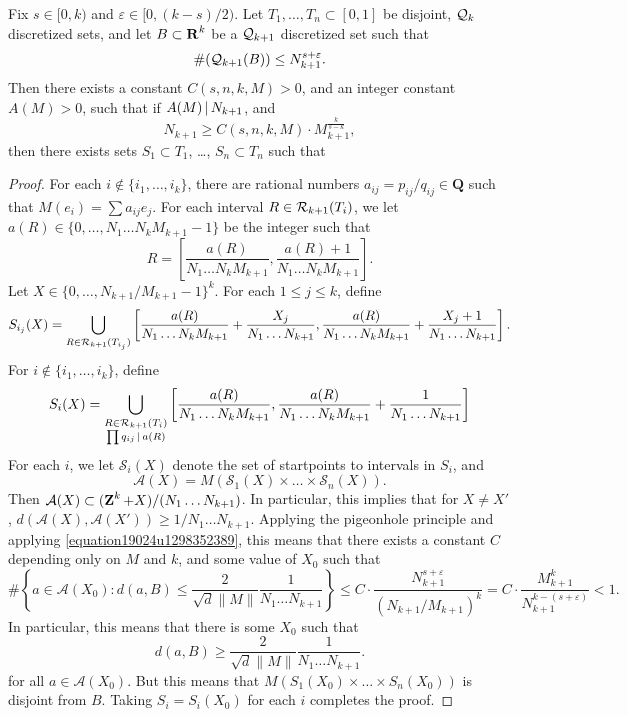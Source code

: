 \begin{theorem} \label{theorem059891891829}
    Fix $s \in [0,k)$ and $\varepsilon \in [0, (k-s)/2)$. Let $T_1, \dots, T_n \subset [0,1]$ be disjoint, $\operatorname{\mathcal{Q}}_k$ discretized sets, and let $B \subset \operatorname{\mathbf{R}}^k$ be a $\operatorname{\mathcal{Q}}_{k+1}$ discretized set such that
    \[ \#(\operatorname{\mathcal{Q}}_{k+1}(B)) \leq N_{k+1}^{s + \varepsilon}. \]
    Then there exists a constant $C(s,n,k,M) > 0$, and an integer constant $A(M) > 0$, such that if $A(M) \operatorname{\mid} N_{k+1}$, and 
    \begin{equation} \label{equation19024u1298352389}
        N_{k+1} \geq C(s,n,k,M) \cdot M_{k+1}^{\frac{k}{s - k}},
    \end{equation}
    then there exists sets $S_1 \subset T_1$, \dots, $S_n \subset T_n$ such that

\end{theorem}
\begin{proof}
    For each $i \not \in \{ i_1, \dots, i_k \}$, there are rational numbers $a_{ij} = p_{ij}/q_{ij} \in \mathbf{Q}$ such that $M(e_i) = \sum a_{ij} e_j$. For each interval $R \in \operatorname{\mathcal{R}}_{k+1}(T_i)$, we let $a(R) \in \{ 0, \dots, N_1 \dots N_k M_{k+1} - 1 \}$ be the integer such that
    \[ R = \left[ \frac{a(R)}{N_1 \dots N_k M_{k+1}}, \frac{a(R) + 1}{N_1 \dots N_k M_{k+1}} \right]. \]
    Let $X \in \{ 0, \dots, N_{k+1}/M_{k+1} - 1 \}^k$. For each $1 \leq j \leq k$, define
    \[ S_{i_j}(X) = \bigcup_{R \in \operatorname{\mathcal{R}}_{k+1}(T_{i_j})} \left[ \frac{a(R)}{N_1 \dots N_k M_{k+1}} + \frac{X_j}{N_1 \dots N_{k+1}}, \frac{a(R)}{N_1 \dots N_k M_{k+1}} + \frac{X_j + 1}{N_1 \dots N_{k+1}} \right]. \]
    For $i \not \in \{ i_1, \dots, i_k \}$, define
    \[ S_i(X) = \bigcup_{\substack{R \in \operatorname{\mathcal{R}}_{k+1}(T_i)\\ \prod q_{ij} \operatorname{\mid} a(R)}} \left[ \frac{a(R)}{N_1 \dots N_k M_{k+1}}, \frac{a(R)}{N_1 \dots N_k M_{k+1}} + \frac{1}{N_1 \dots N_{k+1}} \right] \]
    For each $i$, we let $\mathcal{S}_i(X)$ denote the set of startpoints to intervals in $S_i$, and
    \[ \mathcal{A}(X) = M(\mathcal{S}_1(X) \times \dots \times \mathcal{S}_n(X)). \]
    Then $\mathcal{A}(X) \subset (\operatorname{\mathbf{Z}}^k + X)/(N_1 \dots N_{k+1})$. In particular, this implies that for $X \neq X'$, $d(\mathcal{A}(X), \mathcal{A}(X')) \geq 1/N_1 \dots N_{k+1}$. Applying the pigeonhole principle and applying \eqref{equation19024u1298352389}, this means that there exists a constant $C$ depending only on $M$ and $k$, and some value of $X_0$ such that
    \[ \# \left\{ a \in \mathcal{A}(X_0) : d(a,B) \leq \frac{2}{\sqrt{d} \| M \|} \frac{1}{N_1 \dots N_{k+1}} \right\} \leq C \cdot \frac{N_{k+1}^{s + \varepsilon}}{(N_{k+1}/M_{k+1})^k} = C \cdot \frac{M_{k+1}^k}{N_{k+1}^{k - (s + \varepsilon)}} < 1. \]
    In particular, this means that there is some $X_0$ such that
    \[ d(a,B) \geq \frac{2}{\sqrt{d} \| M \|} \frac{1}{N_1 \dots N_{k+1}}. \]
    for all $a \in \mathcal{A}(X_0)$. But this means that $M(S_1(X_0) \times \dots \times S_n(X_0))$ is disjoint from $B$. Taking $S_i = S_i(X_0)$ for each $i$ completes the proof.
\end{proof}

